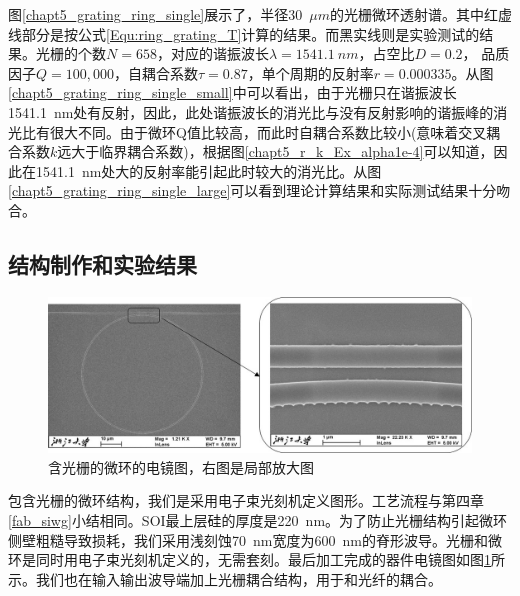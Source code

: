 图\ref{chapt5_grating_ring_single}展示了，半径30~$\mu m$的光栅微环透射谱。其中红虚线部分是按公式\ref{Equ:ring_grating_T}计算的结果。而黑实线则是实验测试的结果。光栅的个数$N = 658$，对应的谐振波长$\lambda = 1541.1~nm$，占空比$D = 0.2$， 品质因子$Q = 100,000$，自耦合系数$\tau = 0.87$，单个周期的反射率$r = 0.000335$。从图\ref{chapt5_grating_ring_single_small}中可以看出，由于光栅只在谐振波长1541.1~nm处有反射，因此，此处谐振波长的消光比与没有反射影响的谐振峰的消光比有很大不同。由于微环Q值比较高，而此时自耦合系数比较小(意味着交叉耦合系数$k$远大于临界耦合系数)，根据图\ref{chapt5_r_k_Ex_alpha1e-4}可以知道，因此在1541.1~nm处大的反射率能引起此时较大的消光比。从图\ref{chapt5_grating_ring_single_large}可以看到理论计算结果和实际测试结果十分吻合。

\subsection{结构制作和实验结果}
\begin{figure}[htb]
	\centering
	\includegraphics[width=12cm]{./Pictures/chapt5_ring_grating_reflector_structure_real.jpg}
	\caption{含光栅的微环的电镜图，右图是局部放大图}
	\label{chapt5_ring_grating_reflector_structure_real}
\end{figure}
包含光栅的微环结构，我们是采用电子束光刻机定义图形。工艺流程与第四章\ref{fab_siwg}小结相同。SOI最上层硅的厚度是220~nm。为了防止光栅结构引起微环侧壁粗糙导致损耗，我们采用浅刻蚀70~nm宽度为600~nm的脊形波导。光栅和微环是同时用电子束光刻机定义的，无需套刻。最后加工完成的器件电镜图如图\ref{chapt5_ring_grating_reflector_structure_real}所示。我们也在输入输出波导端加上光栅耦合结构，用于和光纤的耦合。

